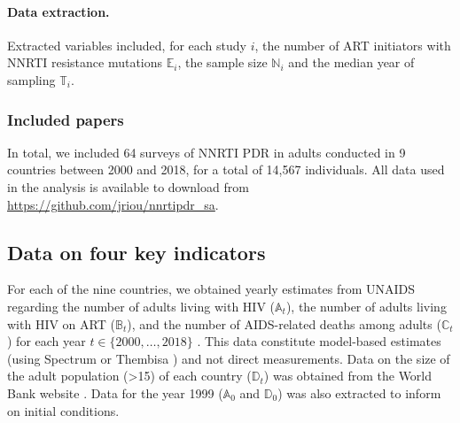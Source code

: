 \documentclass{article}
\begin{document}
	\paragraph{Data extraction.}
	Extracted variables included, for each study $i$, the number of ART initiators with NNRTI resistance mutations $\mathds{E}_i$, the sample size $\mathds{N}_i$ and the median year of sampling $\mathds{T}_i$.
	
	\subsubsection{Included papers}
	In total, we included 64 surveys of NNRTI PDR in adults conducted in 9 countries between 2000 and 2018, for a total of 14,567 individuals.
	All data used in the analysis is available to download from \url{https://github.com/jriou/nnrtipdr_sa}.
	
	\subsection{Data on four key indicators}
	
	For each of the nine countries, we obtained yearly estimates from UNAIDS regarding the number of adults living with HIV ($\mathds{A}_t$), the number of adults living with HIV on ART ($\mathds{B}_t$), and the number of AIDS-related deaths among adults ($\mathds{C}_t$) for each year $t \in \{2000,\ldots,2018\}$ \cite{unaidsdata2018}.
	This data constitute model-based estimates (using Spectrum or Thembisa \cite{stover2012updates,johnson2014thembisa}) and not direct measurements.
	Data on the size of the adult population (>15) of each country ($\mathds{D}_t$) was obtained from the World Bank website \cite{worldbank}.
	Data for the year 1999 ($\mathds{A}_0$ and $\mathds{D}_0$) was also extracted to inform on initial conditions.
	
\end{document}
